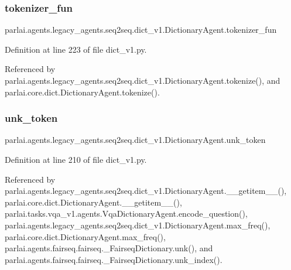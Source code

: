 \subsubsection{\texorpdfstring{tokenizer\+\_\+fun}{tokenizer\_fun}}
{\footnotesize\ttfamily parlai.\+agents.\+legacy\+\_\+agents.\+seq2seq.\+dict\+\_\+v1.\+Dictionary\+Agent.\+tokenizer\+\_\+fun}



Definition at line 223 of file dict\+\_\+v1.\+py.



Referenced by parlai.\+agents.\+legacy\+\_\+agents.\+seq2seq.\+dict\+\_\+v1.\+Dictionary\+Agent.\+tokenize(), and parlai.\+core.\+dict.\+Dictionary\+Agent.\+tokenize().

\mbox{\label{classparlai_1_1agents_1_1legacy__agents_1_1seq2seq_1_1dict__v1_1_1DictionaryAgent_a6f9b9ac8f03866f129a4df6d36232c31}} 
\subsubsection{\texorpdfstring{unk\+\_\+token}{unk\_token}}
{\footnotesize\ttfamily parlai.\+agents.\+legacy\+\_\+agents.\+seq2seq.\+dict\+\_\+v1.\+Dictionary\+Agent.\+unk\+\_\+token}



Definition at line 210 of file dict\+\_\+v1.\+py.



Referenced by parlai.\+agents.\+legacy\+\_\+agents.\+seq2seq.\+dict\+\_\+v1.\+Dictionary\+Agent.\+\_\+\+\_\+getitem\+\_\+\+\_\+(), parlai.\+core.\+dict.\+Dictionary\+Agent.\+\_\+\+\_\+getitem\+\_\+\+\_\+(), parlai.\+tasks.\+vqa\+\_\+v1.\+agents.\+Vqa\+Dictionary\+Agent.\+encode\+\_\+question(), parlai.\+agents.\+legacy\+\_\+agents.\+seq2seq.\+dict\+\_\+v1.\+Dictionary\+Agent.\+max\+\_\+freq(), parlai.\+core.\+dict.\+Dictionary\+Agent.\+max\+\_\+freq(), parlai.\+agents.\+fairseq.\+fairseq.\+\_\+\+Fairseq\+Dictionary.\+unk(), and parlai.\+agents.\+fairseq.\+fairseq.\+\_\+\+Fairseq\+Dictionary.\+unk\+\_\+index().

